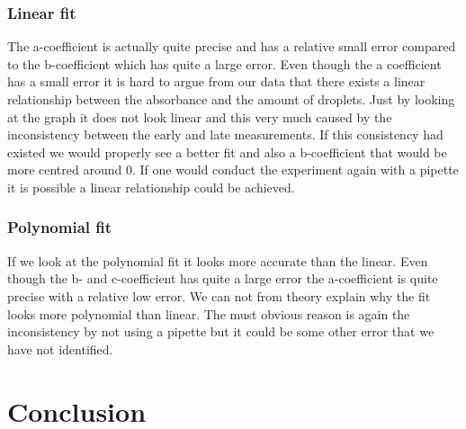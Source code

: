 \documentclass[working, oneside]{inputs/tuftebook}
\begin{document}
\subsubsection*{Linear fit}
The a-coefficient is actually quite precise and has a relative small error compared to the b-coefficient which has quite a large error. Even though the a coefficient has a small error it is hard to argue from our data that there exists a linear relationship between the absorbance and the amount of droplets. Just by looking at the graph it does not look linear and this very much caused by the inconsistency between the early and late measurements. If this consistency had existed we would properly see a better fit and also a b-coefficient that would be more centred around 0. If one would conduct the experiment again with a pipette it is possible a linear relationship could be achieved.
\subsubsection*{Polynomial fit}
If we look at the polynomial fit it looks more accurate than the linear. Even though the b- and c-coefficient has quite a large error the a-coefficient is quite precise with a relative low error. We can not from theory explain why the fit looks more polynomial than linear. The must obvious reason is again the inconsistency by not using a pipette but it could be some other error that we have not identified.
\section*{Conclusion}
\end{document}
